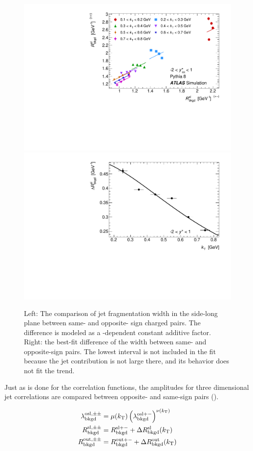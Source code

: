 \begin{figure}[t]
\begin{minipage}[t]{1.0\textwidth}
\centering
\includegraphics[width=.55\linewidth]{can_kt_qosl_backR.pdf}
\includegraphics[width=.44\linewidth]{can_kt_qosl_backR_intercept.pdf}
\end{minipage}
\caption{
  Left: The comparison of jet fragmentation width in the side-long plane between same- and opposite- sign charged pairs. The difference is modeled as a \kt-dependent constant additive factor. Right: the best-fit difference of the width between same- and opposite-sign pairs. The lowest \kt interval is not included in the fit because the jet contribution is not large there, and its behavior does not fit the trend.
}
\label{fig:background_qosl_R_same_vs_opp_pythia8}
\end{figure}


Just as is done for the \qinv correlation functions, the amplitudes for three dimensional jet correlations are compared between opposite- and same-sign pairs ().

\begin{align}
\lambda_{\mathrm{bkgd}}^{\mathrm{osl},\pm\pm} &= \mu(k_\mathrm{T}) \left(\lambda_{\mathrm{bkgd}}^{\mathrm{osl}+-}\right)^{\nu(k_\mathrm{T})} \label{eqn:lambdaBackParOSL}\\
R_{\mathrm{bkgd}}^{\mathrm{sl},\pm\pm} &= R_{\mathrm{bkgd}}^{\mathrm{sl}+-} + \Delta R_{\mathrm{bkgd}}^{\mathrm{sl}}(k_\mathrm{T}) \label{eqn:rBackParSL}\\
R_{\mathrm{bkgd}}^{\mathrm{out},\pm\pm} &= R_{\mathrm{bkgd}}^{\mathrm{out}+-} + \Delta R_{\mathrm{bkgd}}^{\mathrm{out}}(k_\mathrm{T}) \label{eqn:rBackParOut}
\end{align}

